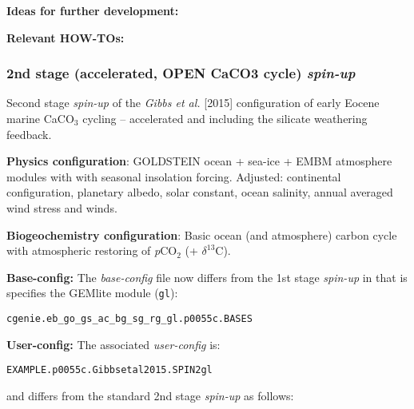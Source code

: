 \documentclass[10pt,twoside]{article}
\begin{document}
\noindent \textbf{Ideas for further development:} 

\noindent \textbf{Relevant HOW-TOs:} 


\subsubsection{2nd stage (accelerated, OPEN CaCO3 cycle) \textit{spin-up}}\label{EXAMPLE.p0055c.Gibbsetal2015.SPIN2gl}

Second stage \textsl{spin-up} of the \textit{Gibbs et al.} [2015] configuration of early Eocene marine CaCO$_{3}$ cycling -- accelerated and including the silicate weathering feedback.

\noindent \textbf{Physics configuration}: GOLDSTEIN ocean + sea-ice + EMBM atmosphere modules with with seasonal insolation forcing. Adjusted: continental configuration, planetary albedo, solar constant, ocean salinity, annual averaged wind stress and winds.

\noindent \textbf{Biogeochemistry configuration}: Basic ocean (and atmosphere) carbon cycle with atmospheric restoring of \textit{p}CO$_{2}$ (+ $\delta^{13}$C).

\noindent \textbf{Base-config:} The \textit{base-config} file now differs from the 1st stage \textit{spin-up} in that is specifies the GEMlite module (\texttt{gl}):
\vspace{-10pt}\begin{verbatim}cgenie.eb_go_gs_ac_bg_sg_rg_gl.p0055c.BASES\end{verbatim}\vspace{-10pt}

\noindent \textbf{User-config:} The associated \textit{user-config} is:
\vspace{-10pt}\begin{verbatim}EXAMPLE.p0055c.Gibbsetal2015.SPIN2gl\end{verbatim}\vspace{-10pt}
and differs from the standard 2nd stage \textit{spin-up} as follows:
\end{document}
